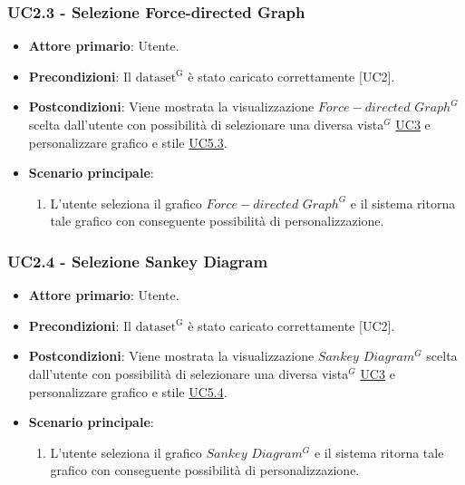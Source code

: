\subsubsection{UC2.3 - Selezione Force-directed Graph}
\label{sec:UC2.3}
\begin{itemize}
    \item \textbf{Attore primario}: Utente.
    \item \textbf{Precondizioni}: Il ${\mathrm{dataset^{G}}}$ è stato caricato correttamente [UC2].
    \item \textbf{Postcondizioni}: Viene mostrata la visualizzazione $Force-directed$ $Graph^{G}$ scelta dall'utente con possibilità di selezionare una diversa vista$^{G}$ \hyperref[sec:UC3]{UC3} e personalizzare grafico e stile \hyperref[sec:UC5.3]{UC5.3}. %
    \item \textbf{Scenario principale}:
          \begin{enumerate}
              \item L'utente seleziona il grafico $Force-directed$ $Graph^{G}$ e il sistema ritorna tale grafico con conseguente possibilità di personalizzazione. 
          \end{enumerate}
\end{itemize}

\subsubsection{UC2.4 - Selezione Sankey Diagram}
\label{sec:UC2.4}
\begin{itemize}
    \item \textbf{Attore primario}: Utente.
    \item \textbf{Precondizioni}: Il ${\mathrm{dataset^{G}}}$ è stato caricato correttamente [UC2].
    \item \textbf{Postcondizioni}: Viene mostrata la visualizzazione $Sankey$ $Diagram^{G}$ scelta dall'utente con possibilità di selezionare una diversa vista$^{G}$ \hyperref[sec:UC3]{UC3} e personalizzare grafico e stile \hyperref[sec:UC5.4]{UC5.4}. %
    \item \textbf{Scenario principale}:
          \begin{enumerate}
              \item L'utente seleziona il grafico $Sankey$ $Diagram^{G}$ e il sistema ritorna tale grafico con conseguente possibilità di personalizzazione. 
          \end{enumerate}
\end{itemize}
\newpage

